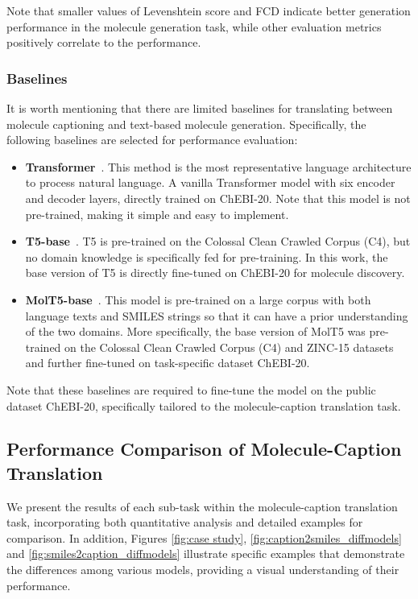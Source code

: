 \documentclass{article}
\theoremstyle{plain}
\theoremstyle{definition}
\theoremstyle{remark}
\begin{document}
Note that smaller values of Levenshtein score and FCD indicate better generation performance in the molecule generation task, while other evaluation metrics positively correlate to the performance.

\subsubsection{Baselines}
It is worth mentioning that there are limited baselines for translating between molecule captioning and text-based molecule generation.
Specifically, the following baselines are selected for performance evaluation:
\begin{itemize}
    \item \textbf{Transformer}~\cite{vaswani2017attention}. This method is the most representative language architecture to process natural language. 
    A vanilla Transformer model with six encoder and decoder layers, directly trained on ChEBI-20. Note that this model is not pre-trained, making it simple and easy to implement. 
    
    \item \textbf{T5-base}~\cite{raffel2020exploring}. 
    T5 is pre-trained on the Colossal Clean Crawled Corpus (C4), but no domain knowledge is specifically fed for pre-training.
    In this work, the base version of T5 is directly fine-tuned on ChEBI-20 for molecule discovery. 
    
    \item \textbf{MolT5-base}~\cite{edwards-etal-2022-translation}. 
     This model is pre-trained on a large corpus with both language texts and SMILES strings so that it can have a prior understanding of the two domains.
    More specifically, the base version of MolT5 was pre-trained on the Colossal Clean Crawled Corpus (C4) and ZINC-15 datasets and further fine-tuned on task-specific dataset ChEBI-20.
\end{itemize}
Note that these baselines are required to fine-tune the model on the public dataset ChEBI-20, specifically tailored to the molecule-caption translation task.

\subsection{Performance Comparison of Molecule-Caption Translation}
We present the results of each sub-task within the molecule-caption translation task, incorporating both quantitative analysis and detailed examples for comparison. 
In addition, Figures \ref{fig:case study}, \ref{fig:caption2smiles_diffmodels} and \ref{fig:smiles2caption_diffmodels} illustrate specific examples that demonstrate the differences among various models, providing a visual understanding of their performance.
\end{document}
